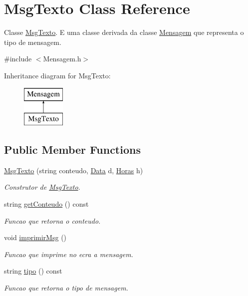 \hypertarget{class_msg_texto}{}\section{Msg\+Texto Class Reference}
\label{class_msg_texto}


Classe \hyperlink{class_msg_texto}{Msg\+Texto}. E uma classe derivada da classe \hyperlink{class_mensagem}{Mensagem} que representa o tipo de mensagem.  




{\ttfamily \#include $<$Mensagem.\+h$>$}

Inheritance diagram for Msg\+Texto\+:\begin{figure}[H]
\begin{center}
\leavevmode
\includegraphics[height=2.000000cm]{class_msg_texto}
\end{center}
\end{figure}
\subsection*{Public Member Functions}
\begin{DoxyCompactItemize}
\item 
\hyperlink{class_msg_texto_a8ad133274a0f20954695cd2b2c619595}{Msg\+Texto} (string conteudo, \hyperlink{class_data}{Data} d, \hyperlink{class_horas}{Horas} h)
\begin{DoxyCompactList}\small\item\em Construtor de \hyperlink{class_msg_texto}{Msg\+Texto}. \end{DoxyCompactList}\item 
string \hyperlink{class_msg_texto_a9743e624bf980d9b4ed0db65a947f203}{get\+Conteudo} () const 
\begin{DoxyCompactList}\small\item\em Funcao que retorna o conteudo. \end{DoxyCompactList}\item 
\hypertarget{class_msg_texto_ac621ebd05f2c55fcfe9746ff402ab26b}{}void \hyperlink{class_msg_texto_ac621ebd05f2c55fcfe9746ff402ab26b}{imprimir\+Msg} ()\label{class_msg_texto_ac621ebd05f2c55fcfe9746ff402ab26b}

\begin{DoxyCompactList}\small\item\em Funcao que imprime no ecra a mensagem. \end{DoxyCompactList}\item 
string \hyperlink{class_msg_texto_acd54b047498f468c1f57a694c1bea591}{tipo} () const 
\begin{DoxyCompactList}\small\item\em Funcao que retorna o tipo de mensagem. \end{DoxyCompactList}\end{DoxyCompactItemize}
